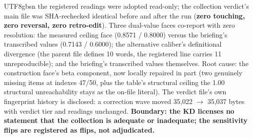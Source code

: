 \documentclass[11pt,letterpaper]{article}
\begin{document}
\begin{CJK}{UTF8}{gbsn}
\textemdash{} the registered readings were adopted read-only; the collection verdict's main file was SHA-rechecked identical before and after the run (\textbf{zero touching, zero reversal, zero retro-edit}). Three dual-value faces co-report with zero resolution: the measured ceiling face (0.8571 / 0.8000) versus the briefing's transcribed values (0.7143 / 0.6000); the alternative caliber's definitional divergence (the parent file defines 10 words, the registered line carries 11 \textemdash{} unreproducible); and the briefing's transcribed values themselves. Root cause: the construction face's beta component, now locally repaired in part (two genuinely missing items at indexes 47/50, plus the table's structural ceiling \textemdash{} the 1.00 structural unreachability stays as the on-file literal). The verdict file's own fingerprint history is disclosed: a correction wave moved 35,022 \ensuremath{\to} 35,037 bytes with verdict tier and readings unchanged. \textbf{Boundary: the KD licenses no statement that the collection is adequate or inadequate; the sensitivity flips are registered as flips, not adjudicated.}


\end{CJK}
\end{document}
